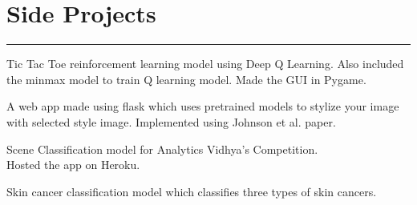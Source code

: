 \documentclass[]{puneet-resume}
\begin{document}
\begin{minipage}[t]{0.66\textwidth}
\section{Side Projects}
\noindent\rule{12.5cm}{0.4pt}
 
\noindent
\hspace{5em}%
\begin{minipage}{0.85\textwidth\vspace{5pt}}
Tic Tac Toe reinforcement learning model using Deep Q Learning.
Also included the minmax model to train Q learning model.
Made the GUI in Pygame.
\end{minipage}
 
\noindent
\hspace{5em}%
\begin{minipage}{0.85\textwidth\vspace{5pt}}
A web app made using flask which uses pretrained models to stylize your image
with selected style image. Implemented using Johnson et al. paper.
\end{minipage}
 
\noindent
\hspace{5em}%
\begin{minipage}{0.85\textwidth\vspace{5pt}}
Scene Classification model for Analytics Vidhya's Competition.\\
Hosted the app on Heroku.
\end{minipage}
 
\noindent
\hspace{5em}%
\begin{minipage}{0.85\textwidth\vspace{5pt}}
Skin cancer classification model which classifies three types of skin cancers.
\end{minipage}
\end{minipage} 
\end{document}
